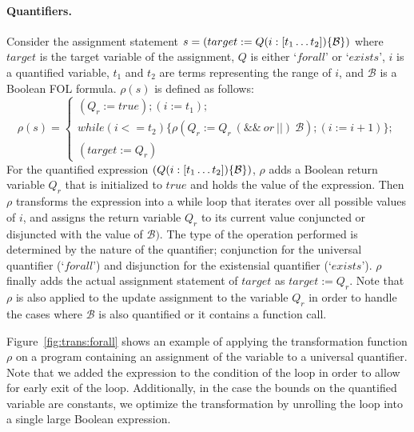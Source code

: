 \paragraph{Quantifiers.} 
Consider the assignment statement $s = \left(target := Q (i:[t_1 \ldots t_2]) \{ \mathcal{B} \} \right)$
where $target$ is the target variable of the assignment, $Q$ is either `$forall$' or `$exists$',
$i$ is a quantified variable, $t_1$ and $t_2$ are terms representing the range of $i$, and 
$\mathcal{B}$ is a Boolean FOL formula. $\rho(s)$ is defined as follows:
\begin{equation}
\rho(s) = 
\begin{cases}
\left( Q_r := true \right) ; \left( i := t_1 \right) ; \\
while(i <= t_2) \{ \rho \left( Q_r := Q_r ~(\&\& ~or~ ||)~ \mathcal{B} \right) ; 
\left( i := i + 1 \right) \}
; \\ 
\left( target := Q_r \right)   
\end{cases}
\end{equation}
For the quantified expression $\left( Q (i:[t_1 \ldots t_2]) \{ \mathcal{B} \} \right)$,
$\rho$ adds a Boolean return variable $Q_r$ that is initialized to $true$ and holds
the value of the expression. Then $\rho$ transforms the expression into a while loop
that iterates over all possible values of $i$, and assigns the return variable $Q_r$
to its current value conjuncted or disjuncted with the value of $\mathcal{B})$.
The type of the operation performed is determined by the nature of the quantifier; 
conjunction for the universal quantifier (`$forall$') and disjunction for the 
existensial quantifier (`$exists$'). $\rho$ finally adds the actual assignment 
statement of $target$ as $target := Q_r$. Note that $\rho$ is also applied 
to the update assignment to the variable $Q_r$ in order to handle the cases
where $\mathcal{B}$ is also quantified or it contains a function call. 


Figure~\ref{fig:trans:forall} shows an example of applying the transformation 
function $\rho$ on a program \Pm containing an assignment of the variable 
to a universal quantifier. 
Note that we added the expression  to the condition of the 
 loop in order to allow for early exit of the loop. 
Additionally, in the case the bounds on the quantified variable are constants, 
we optimize the transformation by unrolling the loop into a single large
Boolean expression.

